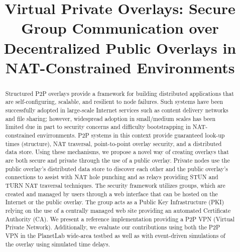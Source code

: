 \documentclass[conference]{IEEEtran}
\begin{document}
\title{Virtual Private Overlays: Secure Group Communication over Decentralized
Public Overlays in NAT-Constrained Environments}

\author{ 
}

\maketitle

\begin{abstract}
Structured P2P overlays provide a framework for building distributed applications that
are self-configuring, scalable, and resilient to node failures.  Such systems
have been successfully adopted in large-scale Internet services such as content
delivery networks and file sharing; however, widespread adoption in small/medium
scales has been limited due in part to security concerns and difficulty
bootstrapping in NAT-constrained envirronments.  P2P systems in this context
provide guaranteed look-up times (structure), NAT traversal, point-to-point overlay
security, and a distributed data store.  Using these mechanisms, we propose
a novel way of creating overlays that are both secure and
private through the use of a public overlay.
Private nodes use the public overlay's distributed data store to discover
each other and the public overlay's connections to assist with NAT hole punching
and as relays providing STUN and TURN NAT traversal techniques.  The security
framework utilizes groups, which are created and managed by users through
a web interface that can be hosted on the Internet or the public overlay.
The group acts as a Public Key Infrastructure (PKI) relying on
the use of a centrally managed web site providing an automated Certificate
Authority (CA).  We present a reference implementation providing a P2P VPN
(Virtual Private Network).  Additionally, we evaluate our contributions using
both the P2P VPN in the PlanetLab wide-area testbed as well as with event-driven
simulations of the overlay using simulated time delays.
\end{abstract}
\end{document}
